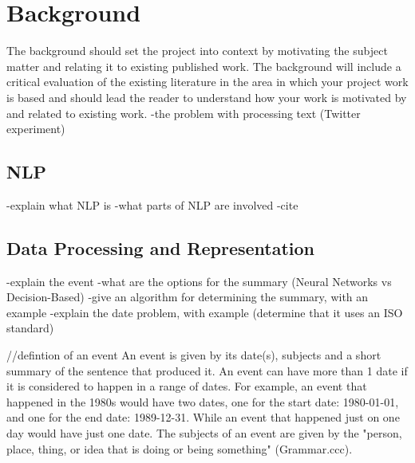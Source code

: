 \chapter{Background}
The background should set the project into context by motivating the subject matter and relating it to existing published work. The background will include a critical evaluation of the existing literature in the area in which your project work is based and should lead the reader to understand how your work is motivated by and related to existing work.
-the problem with processing text (Twitter experiment)

\section{NLP}
-explain what NLP is
-what parts of NLP are involved
-cite
\section{Data Processing and Representation}
-explain the event
-what are the options for the summary (Neural Networks vs Decision-Based)
-give an algorithm for determining the summary, with an example
-explain the date problem, with example (determine that it uses an ISO standard)



//defintion of an event
An event is given by its date(s), subjects and a short summary of the sentence that produced it. An event can have more than 1 date if it is considered to happen in a range of dates. For example, an event that happened in the 1980s would have two dates, one for the start date: 1980-01-01, and one for the end date: 1989-12-31. While an event that happened just on one day would have just one date. The subjects of an event are given by the "person, place, thing, or idea that is doing or being something" (Grammar.ccc).
